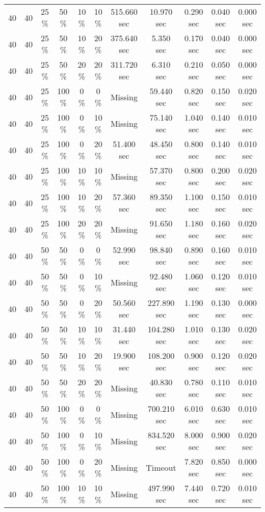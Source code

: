 \documentclass{article}
\begin{document}
\begin{longtable}[]{@{}ccccccccccc@{}}
40 & 40 & 25 \% & 50 \% & 10 \% & 10 \% & 515.660 sec & 10.970 sec & 0.290 sec & 0.040 sec & 0.000 sec \\
40 & 40 & 25 \% & 50 \% & 10 \% & 20 \% & 375.640 sec & 5.350 sec & 0.170 sec & 0.040 sec & 0.000 sec \\
40 & 40 & 25 \% & 50 \% & 20 \% & 20 \% & 311.720 sec & 6.310 sec & 0.210 sec & 0.050 sec & 0.000 sec \\
40 & 40 & 25 \% & 100 \% & 0 \% & 0 \% & Missing & 59.440 sec & 0.820 sec & 0.150 sec & 0.020 sec \\
40 & 40 & 25 \% & 100 \% & 0 \% & 10 \% & Missing & 75.140 sec & 1.040 sec & 0.140 sec & 0.010 sec \\
40 & 40 & 25 \% & 100 \% & 0 \% & 20 \% & 51.400 sec & 48.450 sec & 0.800 sec & 0.140 sec & 0.010 sec \\
40 & 40 & 25 \% & 100 \% & 10 \% & 10 \% & Missing & 57.370 sec & 0.800 sec & 0.200 sec & 0.020 sec \\
40 & 40 & 25 \% & 100 \% & 10 \% & 20 \% & 57.360 sec & 89.350 sec & 1.100 sec & 0.150 sec & 0.010 sec \\
40 & 40 & 25 \% & 100 \% & 20 \% & 20 \% & Missing & 91.650 sec & 1.180 sec & 0.160 sec & 0.020 sec \\
40 & 40 & 50 \% & 50 \% & 0 \% & 0 \% & 52.990 sec & 98.840 sec & 0.890 sec & 0.160 sec & 0.010 sec \\
40 & 40 & 50 \% & 50 \% & 0 \% & 10 \% & Missing & 92.480 sec & 1.060 sec & 0.120 sec & 0.010 sec \\
40 & 40 & 50 \% & 50 \% & 0 \% & 20 \% & 50.560 sec & 227.890 sec & 1.190 sec & 0.130 sec & 0.000 sec \\
40 & 40 & 50 \% & 50 \% & 10 \% & 10 \% & 31.440 sec & 104.280 sec & 1.010 sec & 0.130 sec & 0.020 sec \\
40 & 40 & 50 \% & 50 \% & 10 \% & 20 \% & 19.900 sec & 108.200 sec & 0.900 sec & 0.120 sec & 0.020 sec \\
40 & 40 & 50 \% & 50 \% & 20 \% & 20 \% & Missing & 40.830 sec & 0.780 sec & 0.110 sec & 0.010 sec \\
40 & 40 & 50 \% & 100 \% & 0 \% & 0 \% & Missing & 700.210 sec & 6.010 sec & 0.630 sec & 0.010 sec \\
40 & 40 & 50 \% & 100 \% & 0 \% & 10 \% & Missing & 834.520 sec & 8.000 sec & 0.900 sec & 0.020 sec \\
40 & 40 & 50 \% & 100 \% & 0 \% & 20 \% & Missing & Timeout & 7.820 sec & 0.850 sec & 0.000 sec \\
40 & 40 & 50 \% & 100 \% & 10 \% & 10 \% & Missing & 497.990 sec & 7.440 sec & 0.720 sec & 0.010 sec \\

\end{longtable}
\end{document}
